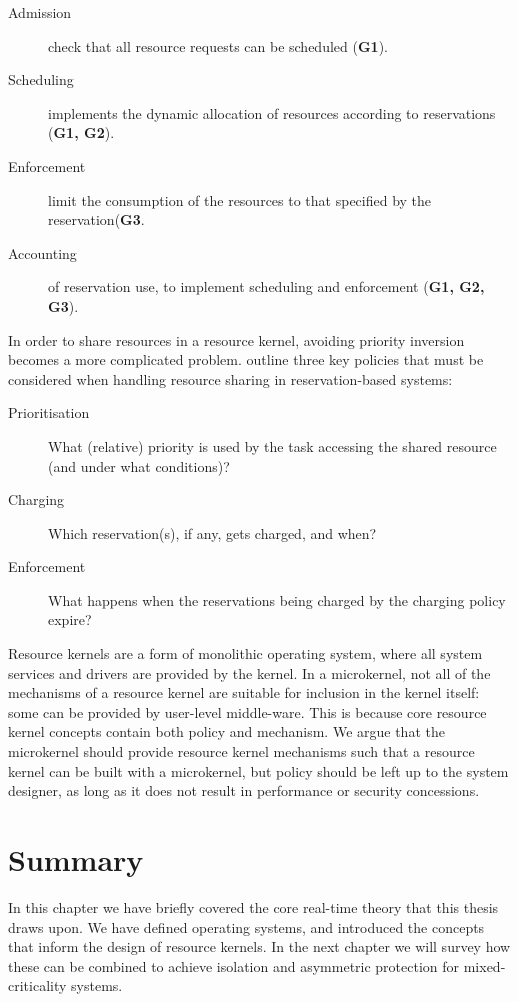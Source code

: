 \begin{description}
	\item[Admission] check that all resource requests can be scheduled (\textbf{G1}).
	\item[Scheduling] implements the dynamic allocation of resources according to reservations (\textbf{G1, G2}).
	\item[Enforcement] limit the consumption of the resources to that specified by the reservation(\textbf{G3}.
	\item[Accounting] of reservation use, to implement scheduling and enforcement (\textbf{G1, G2, G3}).
\end{description}

In order to share resources in a resource kernel, avoiding priority inversion becomes a more
complicated problem.  \citet{deNiz_LSR_01} outline three key policies that must be considered when
handling resource sharing in reservation-based systems:

\begin{description}
    \item[Prioritisation] What (relative) priority is used by the task accessing the shared resource (and under what conditions)?
    \item[Charging] Which reservation(s), if any, gets charged, and when?
    \item[Enforcement] What happens when the reservations being charged by the charging policy expire?
\end{description}

Resource kernels are a form of monolithic operating system, where all system services and drivers
are provided by the kernel.  In a microkernel, not all of the mechanisms of a resource kernel are
suitable for inclusion in the kernel itself: some can be provided by user-level middle-ware.  This
is because core resource kernel concepts contain both policy and mechanism.  We argue that the
microkernel should provide resource kernel mechanisms such that a resource kernel can be built with
a microkernel, but policy should be left up to the system designer, as long as it does not result in
performance or security concessions.

\section{Summary}

In this chapter we have briefly covered the core real-time theory that this thesis draws upon.
We have defined operating systems, and introduced the concepts that inform the design of resource kernels.
In the next chapter we will survey how these can be combined to achieve isolation and asymmetric protection for mixed-criticality systems.
